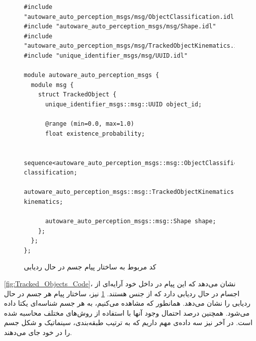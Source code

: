 \begin{figure}[h!]
    \centering
    \begin{latin}
        \begin{lstlisting}[style=code]
#include "autoware_auto_perception_msgs/msg/ObjectClassification.idl"
#include "autoware_auto_perception_msgs/msg/Shape.idl"
#include "autoware_auto_perception_msgs/msg/TrackedObjectKinematics.idl"
#include "unique_identifier_msgs/msg/UUID.idl"

module autoware_auto_perception_msgs {
  module msg {
    struct TrackedObject {
      unique_identifier_msgs::msg::UUID object_id;

      @range (min=0.0, max=1.0)
      float existence_probability;

      sequence<autoware_auto_perception_msgs::msg::ObjectClassification> classification;
      autoware_auto_perception_msgs::msg::TrackedObjectKinematics kinematics;

      autoware_auto_perception_msgs::msg::Shape shape;
    };
  };
};
        \end{lstlisting}
    \end{latin}
    \caption{کد مربوط به ساختار پیام جسم در حال ردیابی}
    \label{fig:Tracked_Object_Code}
\end{figure}

\cref{fig:Tracked_Objects_Code}، نشان ‌می‌دهد که این پیام در داخل خود آرایه‌ای از اجسام در حال ردیابی دارد که از جنس  هستند. \cref{fig:Tracked_Object_Code} نیز، ساختار پیام‌ هر جسم در حال ردیابی را نشان می‌دهد. همانطور که مشاهده می‌کنیم، به هر جسم شناسه‌ای یکتا داده می‌شود. همچنین درصد احتمال وجود آنها با استفاده از روش‌های مختلف محاسبه شده است. 
در آخر نیز سه داده‌ی مهم داریم که به ترتیب طبقه‌بندی، سینماتیک و شکل جسم را در خود جای می‌دهند. 

